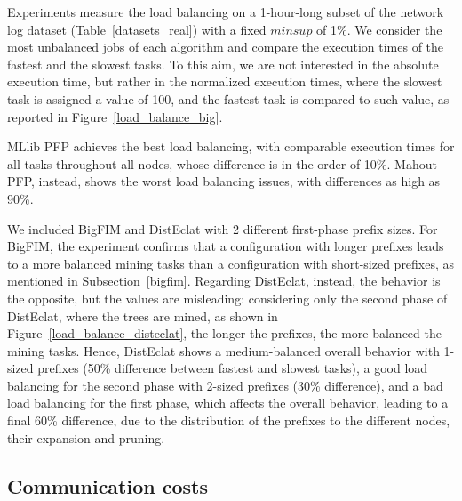 Experiments measure the load balancing on a 1-hour-long subset of the
network log dataset (Table~\ref{datasets_real}) with a fixed $minsup$ of 1\%.
We consider the most unbalanced jobs of each algorithm
and compare the execution times of the fastest and the slowest tasks.
To this aim, we are not interested in the absolute execution time,
but rather in the normalized execution times, where the slowest task is
assigned a value of 100, and the fastest task is compared to such value,
as reported in Figure~\ref{load_balance_big}.

MLlib PFP achieves the best load balancing, with comparable
execution times for all tasks throughout all nodes,
whose difference is in the order of 10\%.
Mahout PFP, instead, shows the worst load balancing issues,
with differences as high as 90\%.

We included BigFIM and DistEclat with 2 different
first-phase prefix sizes.
For BigFIM, the experiment confirms that a configuration with longer prefixes
leads to a more balanced mining tasks than a configuration with short-sized prefixes,
as mentioned in Subsection~\ref{bigfim}.
Regarding DistEclat, instead, the behavior is the opposite,
but the values are misleading: considering only the second phase of DistEclat,
where the trees are mined, as shown in Figure~\ref{load_balance_disteclat},
the longer the prefixes, the more balanced the mining tasks.
Hence, DistEclat shows a medium-balanced overall behavior with 1-sized prefixes
(50\% difference between fastest and slowest tasks),
a good load balancing for the second phase with 2-sized prefixes (30\% difference),
and a bad load balancing for the first phase, which affects the overall behavior,
leading to a final 60\% difference, due to the distribution of the prefixes to
the different nodes, their expansion and pruning.






\subsection{Communication costs}
\label{communication_costs}

